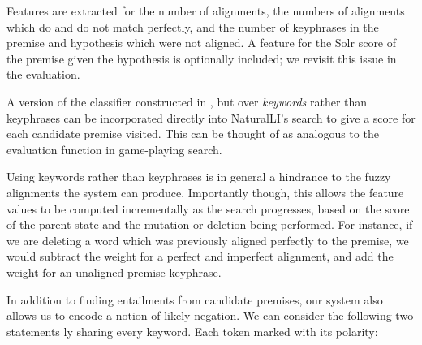 Features are extracted for the number of alignments, the numbers of alignments
  which do and do not match perfectly, 
  and the number of keyphrases in the premise and hypothesis
  which were not aligned.
A feature for the Solr score of the premise given the hypothesis is optionally
  included; we revisit this issue in the evaluation.

%
%
A version of the classifier constructed in 
  , but over \textit{keywords} rather
  than keyphrases can be incorporated directly into
  NaturalLI's search to give a score for each candidate premise visited.
This can be thought of as analogous to the evaluation function in game-playing
  search.


Using keywords rather than keyphrases is in general a hindrance to the
  fuzzy alignments the system can produce.
Importantly though, this allows the feature values to be computed 
  incrementally as the search
  progresses, based on the score of the parent state and the mutation or
  deletion being performed.
For instance, if we are deleting a word which was previously aligned perfectly
  to the premise, we would subtract the weight for a perfect and imperfect
  alignment, and add the weight for an unaligned premise keyphrase.

In addition to finding entailments from candidate premises, our system also
  allows us to encode a notion of likely negation.
We can consider the following two statements \naive ly sharing every keyword.
Each token marked with its polarity:


